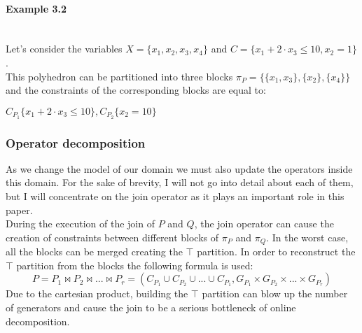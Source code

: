  
\paragraph{Example 3.2} \mbox{}\\
Let's consider the variables $X = \{x_1,x_2,x_3,x_4\}$ and $C = \{ x_1 + 2 \cdot x_3 \leq 10, x_2 = 1 \}$.\\
This polyhedron can be partitioned into three blocks $\pi_P = \{\{x_1,x_3\},\{x_2\},\{x_4\}\}$ and the constraints of the corresponding blocks are equal to: 
\begin{center}
	$C_{P_1}\{x_1 + 2\cdot x_3 \leq 10 \} , C_{P_2}\{x_2 = 10 \}$
\end{center}


\subsubsection{Operator decomposition}
As we change the model of our domain we must also update the operators inside this domain. For the sake of brevity, I will not go into detail about each of them, but I will concentrate on the join operator as it plays an important role in this paper.\\
During the execution of the join of $P$ and $Q$, the join operator can cause the creation of constraints between different blocks of $\pi_P$ and $\pi_Q$. In the worst case, all the blocks can be merged creating the $\top$ partition. In order to reconstruct the $\top$ partition from the blocks the following formula is used:
\begin{equation}
    P = P_1 \Join P_2 \Join ... \Join P_r = (C_{P_1} \cup C_{P_2} \cup ... \cup C_{P_1}, G_{P_1} \times G_{P_2} \times  ... \times   G_{P_r})
\end{equation}
Due to the cartesian product, building the $\top$ partition can blow up the number of generators and cause the join to be a serious bottleneck of online decomposition.

